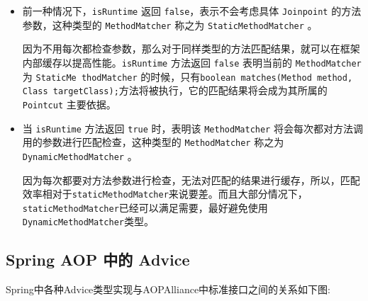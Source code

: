\begin{itemize}
    \item 前一种情况下，\texttt{isRuntime} 返回 \texttt{false}，表示不会考虑具体 \texttt{Joinpoint} 的方法参数，这种类型的 \texttt{MethodMatcher} 称之为 \texttt{StaticMethodMatcher} 。
    
    因为不用每次都检查参数，那么对于同样类型的方法匹配结果，就可以在框架内部缓存以提高性能。\texttt{isRuntime} 方法返回 \texttt{false} 表明当前的 \texttt{MethodMatcher} 为 \texttt{StaticMe thodMatcher} 的时候，只有\texttt{boolean matches(Method method, Class targetClass);}方法将被执行，它的匹配结果将会成为其所属的 \texttt{Pointcut} 主要依据。
    \item 当 \texttt{isRuntime} 方法返回 \texttt{true} 时，表明该 \texttt{MethodMatcher} 将会每次都对方法调用的参数进行匹配检查，这种类型的 \texttt{MethodMatcher} 称之为 \texttt{DynamicMethodMatcher} 。
    
    因为每次都要对方法参数进行检查，无法对匹配的结果进行缓存，所以，匹配效率相对于\texttt{staticMethodMatcher}来说要差。而且大部分情况下，\texttt{staticMethodMatcher}已经可以满足需要，最好避免使用\texttt{DynamicMethodMatcher}类型。
\end{itemize}

\subsection{Spring AOP 中的 Advice}

Spring中各种Advice类型实现与AOPAlliance中标准接口之间的关系如下图:

